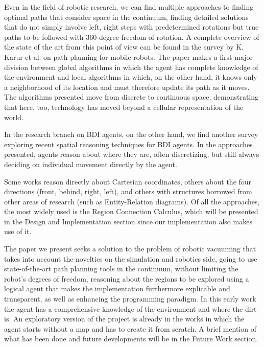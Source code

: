 Even in the field of robotic research, we can find multiple approaches to finding optimal paths that consider space in the continuum, finding detailed solutions that do not simply involve left, right steps with predetermined rotations but true paths to be followed with 360-degree freedom of rotation.
A complete overview of the state of the art from this point of view can be found in the survey\cite{Karur2021ASO} by K. Karur et al. on path planning for mobile robots.
The paper makes a first major division between global algorithms in which the agent has complete knowledge of the environment and local algorithms in which, on the other hand, it knows only a neighborhood of its location and must therefore update its path as it moves.
The algorithms presented move from discrete to continuous space, demonstrating that here, too, technology has moved beyond a cellular representation of the world.

In the research branch on BDI agents, on the other hand, we find another survey exploring recent spatial reasoning techniques for BDI agents\cite{cilc}.
In the approaches presented, agents reason about where they are, often discretizing, but still always deciding on individual movement directly by the agent.

Some works reason directly about Cartesian coordinates, others about the four directions (front, behind, right, left), and others with structures borrowed from other areas of research (such as Entity-Relation diagrams).
Of all the approaches, the most widely used is the Region Connection Calculus, which will be presented in the Design and Implementation section since our implementation also makes use of it.

The paper we present seeks a solution to the problem of robotic vacuuming that takes into account the novelties on the simulation and robotics side, going to use state-of-the-art path planning tools in the continuum, without limiting the robot's degrees of freedom, reasoning about the regions to be explored using a logical agent that makes the implementation furthermore explicable and transparent, as well as enhancing the programming paradigm.
In this early work the agent has a comprehensive knowledge of the environment and where the dirt is.
An exploratory version of the project is already in the works in which the agent starts without a map and has to create it from scratch.
A brief mention of what has been done and future developments will be in the Future Work section.